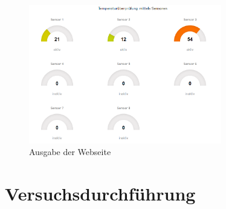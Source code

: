 \begin{figure}[H]%
\centering
\includegraphics[width=0.75\textwidth]{Images/Webseite.png}
\caption{Ausgabe der Webseite}
\label{fig:webpage}
\end{figure}

\section{Versuchsdurchführung}